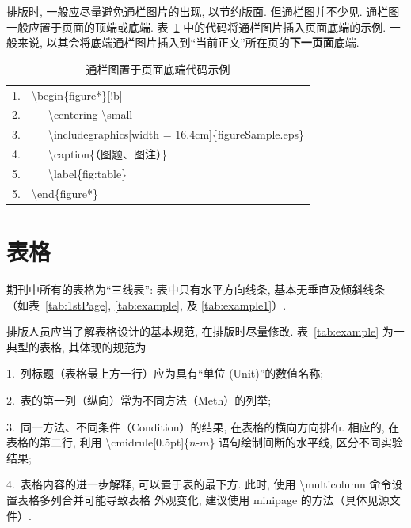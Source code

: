 \documentclass[twoside,twocolumn]{article}
\begin{document}
\begin{CJK}{UTF8}{song}
排版时, 一般应尽量避免通栏图片的出现, 以节约版面. 
但通栏图并不少见. 通栏图一般应置于页面的顶端或底端. 
表~\ref{tab:insertFigFull} 中的代码将通栏图片插入页面底端的示例. 一般来说, 
以其会将底端通栏图片插入到“当前正文”所在页的\textbf{下一页面}底端. 

\begin{table}[!p]
\centering\footnotesize
\caption{通栏图置于页面底端代码示例}
\label{tab:insertFigFull}
\begin{tabular*}{7.9cm}{c@{\ }l}
\toprule[0.75pt]
1. & \textbackslash begin\{figure*\}[!b]\\
2. & \ \ \ \textbackslash centering \textbackslash small \\
3. & \ \ \ \textbackslash includegraphics[width = 16.4cm]\{figureSample.eps\}\\
4. & \ \ \ \textbackslash caption\{（图题、图注）\} \\
5. & \ \ \ \textbackslash label\{fig:table\} \\
5. & \textbackslash end\{figure*\}\\
\bottomrule[0.75pt]
\end{tabular*}
\end{table}

\section{表格}

期刊中所有的表格为“三线表”: 表中只有水平方向线条, 基本无垂直及倾斜线条
（如表~\ref{tab:1stPage}, \ref{tab:example}, 及 \ref{tab:example1}）. 

排版人员应当了解表格设计的基本规范, 在排版时尽量修改. 表~\ref{tab:example} 为一典型的表格, 其体现的规范为

1.~列标题（表格最上方一行）应为具有“单位 (Unit)”的数值名称;

2.~表的第一列（纵向）常为不同方法（Meth）的列举;

3.~同一方法、不同条件（Condition）的结果, 在表格的横向方向排布. 相应的, 在表格的第二行, 
利用 \textbackslash cmidrule[0.5pt]\{$n$-$m$\} 语句绘制间断的水平线, 区分不同实验结果; 

4.~表格内容的进一步解释, 可以置于表的最下方. 
此时, 使用 \textbackslash multicolumn 命令设置表格多列合并可能导致表格
外观变化, 建议使用 minipage 的方法（具体见源文件）.


\end{CJK}
\end{document}
